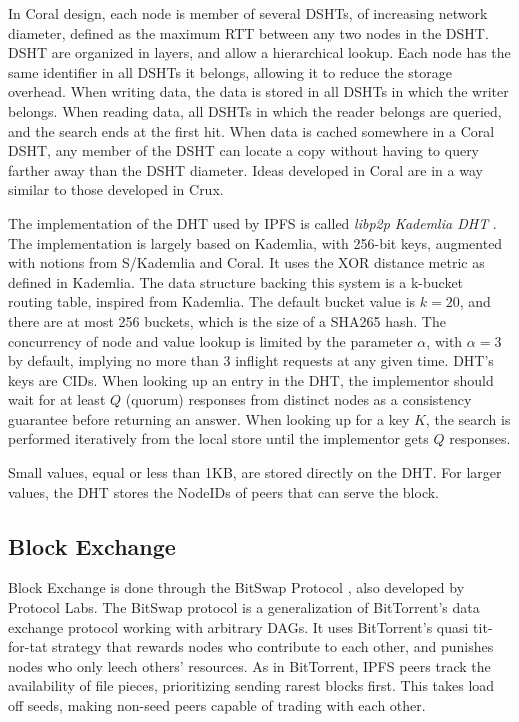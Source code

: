 \documentclass[a4paper,11pt,oneside]{report}
\begin{document}
In Coral design, each node is member of several DSHTs, of increasing network diameter, defined as the maximum RTT between any two nodes in the DSHT. DSHT are organized in layers, and allow a hierarchical lookup. Each node has the same identifier in all DSHTs it belongs, allowing it to reduce the storage overhead. When writing data, the data is stored in all DSHTs in which the writer belongs. When reading data, all DSHTs in which the reader belongs are queried, and the search ends at the first hit. When data is cached somewhere in a Coral DSHT, any member of the DSHT can locate a copy without having to query farther away than the DSHT diameter. Ideas developed in Coral are in a way similar to those developed in Crux.

The implementation of the DHT used by IPFS is called \textit{libp2p Kademlia DHT} \cite{libp2p}. The implementation is largely based on Kademlia, with 256-bit keys, augmented with notions from S/Kademlia and Coral. It uses the XOR distance metric as defined in Kademlia. The data structure backing this system is a k-bucket routing table, inspired from Kademlia. The default bucket value is $k=20$, and there are at most 256 buckets, which is the size of a SHA265 hash. The concurrency of node and value lookup is limited by the parameter $\alpha$, with $\alpha=3$ by default, implying no more than 3 inflight requests at any given time. DHT's keys are CIDs. When looking up an entry in the DHT, the implementor should wait for at least $Q$ (quorum) responses from distinct nodes as a consistency guarantee before returning an answer. When looking up for a key $K$, the search is performed iteratively from the local store until the implementor gets $Q$ responses.

Small values, equal or less than 1KB, are stored directly on the DHT. For larger values, the DHT stores the NodeIDs of peers that can serve the block.

\subsection{Block Exchange}

Block Exchange is done through the BitSwap Protocol \cite{bitswap}, also developed by Protocol Labs. The BitSwap protocol is a generalization of BitTorrent’s data exchange protocol \cite{bittorrent} working with arbitrary DAGs. It uses BitTorrent's quasi tit-for-tat strategy that rewards nodes who contribute to each other, and punishes nodes who only leech others’ resources. As in BitTorrent, IPFS peers track the availability of file pieces, prioritizing sending rarest blocks first. This takes load off seeds, making non-seed peers capable of trading with each other.
\end{document}
